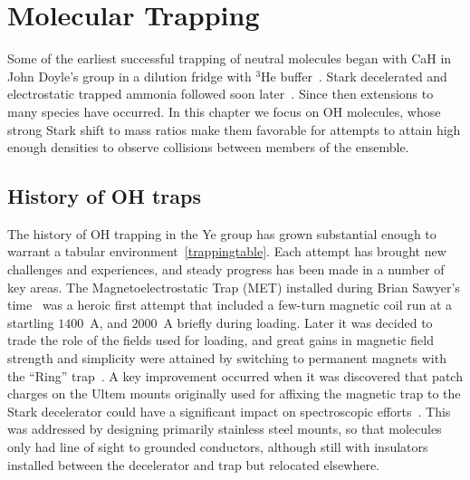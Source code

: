 \ifx\justbeingincluded\undefined


\fi

\chapter{Molecular Trapping}

Some of the earliest successful trapping of neutral molecules began with CaH in John Doyle's group in a dilution fridge with $^3$He buffer~\cite{Weinstein1998}.
Stark decelerated and electrostatic trapped ammonia followed soon later~\cite{Bethlem2000trap}.
Since then extensions to many species have occurred. 
In this chapter we focus on OH molecules, whose strong Stark shift to mass ratios make them favorable for attempts to attain high enough densities to observe collisions between members of the ensemble.

\section{History of OH traps}

The history of OH trapping in the Ye group has grown substantial enough to warrant a tabular environment~\ref{trappingtable}. 
Each attempt has brought new challenges and experiences, and steady progress has been made in a number of key areas.
The Magnetoelectrostatic Trap (MET) installed during Brian Sawyer's time~\cite{Sawyer2007} was a heroic first attempt that included a few-turn magnetic coil run at a startling $1400$~A, and $2000$~A briefly during loading.
Later it was decided to trade the role of the fields used for loading, and great gains in magnetic field strength and simplicity were attained by switching to permanent magnets with the ``Ring'' trap~\cite{Sawyer2011}.
A key improvement occurred when it was discovered that patch charges on the Ultem mounts originally used for affixing the magnetic trap to the Stark decelerator could have a significant impact on spectroscopic efforts~\citep[Fig.~6]{Stuhl2012uwave}.
This was addressed by designing primarily stainless steel mounts, so that molecules only had line of sight to grounded conductors, although still with insulators installed between the decelerator and trap but relocated elsewhere.

